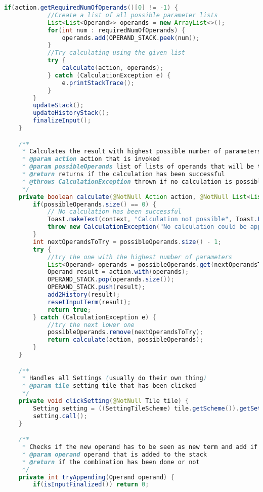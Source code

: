 \begin{lstlisting}[caption=Presenter,label=list:Presenter,language=Java]
        if(action.getRequiredNumOfOperands()[0] != -1) {
            //Create a list of all possible parameter lists
            List<List<Operand>> operands = new ArrayList<>();
            for(int num : requiredNumOfOperands) {
                operands.add(OPERAND_STACK.peek(num));
            }
            //Try calculating using the given list
            try {
                calculate(action, operands);
            } catch (CalculationException e) {
                e.printStackTrace();
            }
        }
        updateStack();
        updateHistoryStack();
        finalizeInput();
    }

    /**
     * Calculates the result with highest possible number of parameters
     * @param action action that is invoked
     * @param possibleOperands list of lists of operands that will be tested from bottom upwards
     * @return returns if the calculation has been successful
     * @throws CalculationException thrown if no calculation is possible
     */
    private boolean calculate(@NotNull Action action, @NotNull List<List<Operand>> possibleOperands) throws CalculationException {
        if(possibleOperands.size() == 0) {
            // No calculation has been successful
            Toast.makeText(context, "Calculation not possible", Toast.LENGTH_LONG).show();
            throw new CalculationException("No calculation could be applied... :(");
        }
        int nextOperandsToTry = possibleOperands.size() - 1;
        try {
            //try the one with the highest number of parameters
            List<Operand> operands = possibleOperands.get(nextOperandsToTry);
            Operand result = action.with(operands);
            OPERAND_STACK.pop(operands.size());
            OPERAND_STACK.push(result);
            add2History(result);
            resetInputTerm(result);
            return true;
        } catch (CalculationException e) {
            //try the next lower one
            possibleOperands.remove(nextOperandsToTry);
            return calculate(action, possibleOperands);
        }
    }

    /**
     * Handles all Settings (usually do their own thing)
     * @param tile setting tile that has been clicked
     */
    private void clickSetting(@NotNull Tile tile) {
        Setting setting = ((SettingTileScheme) tile.getScheme()).getSetting();
        setting.call();
    }

    /**
     * Checks if the new operand has to be seen as new term and add if it works
     * @param operand operand that is added to the stack
     * @return if the combination has been done or not
     */
    private int tryAppending(Operand operand) {
        if(isInputFinalized()) return 0;


\end{lstlisting}
